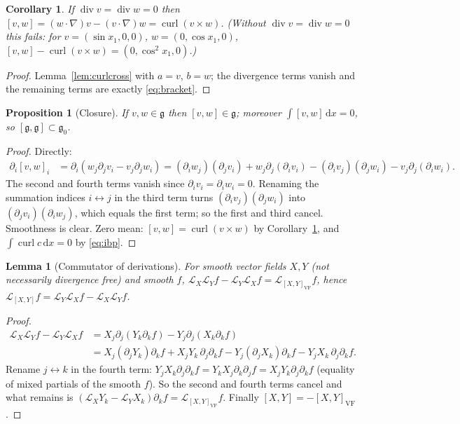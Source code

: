 \documentclass[11pt]{article}
\newtheorem{proposition}[theorem]{Proposition}
\newtheorem{lemma}[theorem]{Lemma}
\newtheorem{corollary}[theorem]{Corollary}
\theoremstyle{definition}
\newcommand{\g}{\mathfrak{g}}
\newcommand{\dd}{\,\mathrm{d}x}
\newcommand{\curl}{\operatorname{curl}}
\renewcommand{\div}{\operatorname{div}}
\newcommand{\Lie}{\mathcal{L}}
\begin{document}
\begin{corollary}\label{cor:curlcross}
If $\div v=\div w=0$ then $[v,w]=(w\cdot\nabla)v-(v\cdot\nabla)w=\curl(v\times w)$.
(Without $\div v=\div w=0$ this fails: for $v=(\sin x_1,0,0)$, $w=(0,\cos x_1,0)$,
$[v,w]-\curl(v\times w)=(0,\cos^2x_1,0)$.)
\end{corollary}
\begin{proof}
Lemma~\ref{lem:curlcross} with $a=v$, $b=w$; the divergence terms vanish and the remaining terms
are exactly \eqref{eq:bracket}.
\end{proof}

\begin{proposition}[Closure]\label{prop:closure}
If $v,w\in\g$ then $[v,w]\in\g$; moreover $\int[v,w]\dd=0$, so $[\g,\g]\subset\g_0$.
\end{proposition}
\begin{proof}
Directly:
\begin{align*}
\partial_i[v,w]_i&=\partial_i(w_j\partial_jv_i-v_j\partial_jw_i)
=(\partial_iw_j)(\partial_jv_i)+w_j\partial_j(\partial_iv_i)-(\partial_iv_j)(\partial_jw_i)-v_j\partial_j(\partial_iw_i).
\end{align*}
The second and fourth terms vanish since $\partial_iv_i=\partial_iw_i=0$. Renaming the summation
indices $i\leftrightarrow j$ in the third term turns $(\partial_iv_j)(\partial_jw_i)$ into
$(\partial_jv_i)(\partial_iw_j)$, which equals the first term; so the first and third cancel.
Smoothness is clear. Zero mean: $[v,w]=\curl(v\times w)$ by Corollary~\ref{cor:curlcross}, and
$\int\curl c\dd=0$ by \eqref{eq:ibp}.
\end{proof}

\begin{lemma}[Commutator of derivations]\label{lem:commutator}
For smooth vector fields $X,Y$ (not necessarily divergence free) and smooth $f$,
$\Lie_X\Lie_Yf-\Lie_Y\Lie_Xf=\Lie_{[X,Y]_{\mathrm{VF}}}f$, hence
$\Lie_{[X,Y]}f=\Lie_Y\Lie_Xf-\Lie_X\Lie_Yf$.
\end{lemma}
\begin{proof}
\begin{align*}
\Lie_X\Lie_Yf-\Lie_Y\Lie_Xf
&=X_j\partial_j(Y_k\partial_kf)-Y_j\partial_j(X_k\partial_kf)\\
&=X_j(\partial_jY_k)\partial_kf+X_jY_k\,\partial_j\partial_kf-Y_j(\partial_jX_k)\partial_kf-Y_jX_k\,\partial_j\partial_kf.
\end{align*}
Rename $j\leftrightarrow k$ in the fourth term: $Y_jX_k\partial_j\partial_kf=Y_kX_j\partial_k\partial_jf=X_jY_k\partial_j\partial_kf$
(equality of mixed partials of the smooth $f$). So the second and fourth terms cancel and what
remains is $(\Lie_XY_k-\Lie_YX_k)\partial_kf=\Lie_{[X,Y]_{\mathrm{VF}}}f$. Finally
$[X,Y]=-[X,Y]_{\mathrm{VF}}$.
\end{proof}
\end{document}
